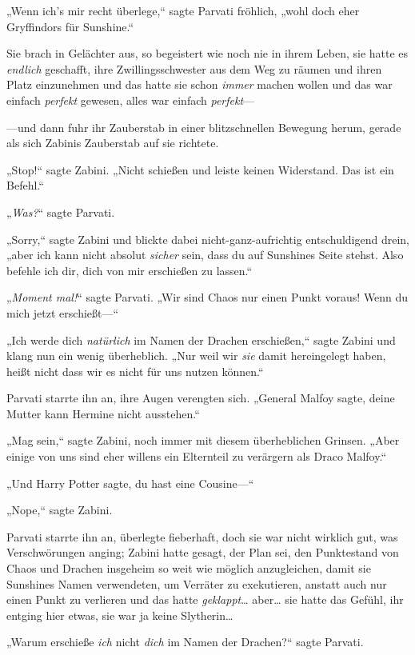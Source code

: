 {„Wenn ich's mir recht überlege,“ sagte Parvati fröhlich, „wohl doch eher Gryffindors für Sunshine.“

Sie brach in Gelächter aus, so begeistert wie noch nie in ihrem Leben, sie hatte es \emph{endlich} geschafft, ihre Zwillingsschwester aus dem Weg zu räumen und ihren Platz einzunehmen und das hatte sie schon \emph{immer} machen wollen und das war einfach \emph{perfekt} gewesen, alles war einfach \emph{perfekt}—

—und dann fuhr ihr Zauberstab in einer blitzschnellen Bewegung herum, gerade als sich Zabinis Zauberstab auf sie richtete.

„Stop!“ sagte Zabini. „Nicht schießen und leiste keinen Widerstand. Das ist ein Befehl.“

„\emph{Was?}“ sagte Parvati.

„Sorry,“ sagte Zabini und blickte dabei nicht-ganz-aufrichtig entschuldigend drein, „aber ich kann nicht absolut \emph{sicher} sein, dass du auf Sunshines Seite stehst. Also befehle ich dir, dich von mir erschießen zu lassen.“

„\emph{Moment mal!}“ sagte Parvati. „Wir sind Chaos nur einen Punkt voraus! Wenn du mich jetzt erschießt—“

„Ich werde dich \emph{natürlich} im Namen der Drachen erschießen,“ sagte Zabini und klang nun ein wenig überheblich. „Nur weil wir \emph{sie} damit hereingelegt haben, heißt nicht dass wir es nicht für uns nutzen können.“

Parvati starrte ihn an, ihre Augen verengten sich. „General Malfoy sagte, deine Mutter kann Hermine nicht ausstehen.“

„Mag sein,“ sagte Zabini, noch immer mit diesem überheblichen Grinsen. „Aber einige von uns sind eher willens ein Elternteil zu verärgern als Draco Malfoy.“

„Und Harry Potter sagte, du hast eine Cousine—“

„Nope,“ sagte Zabini.

Parvati starrte ihn an, überlegte fieberhaft, doch sie war nicht wirklich gut, was Verschwörungen anging; Zabini hatte gesagt, der Plan sei, den Punktestand von Chaos und Drachen insgeheim so weit wie möglich anzugleichen, damit sie Sunshines Namen verwendeten, um Verräter zu exekutieren, anstatt auch nur einen Punkt zu verlieren und das hatte \emph{geklappt}… aber… sie hatte das Gefühl, ihr entging hier etwas, sie war ja keine Slytherin…

„Warum erschieße \emph{ich} nicht \emph{dich} im Namen der Drachen?“ sagte Parvati.

}
